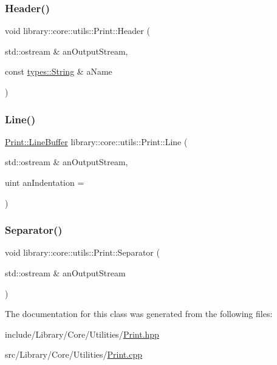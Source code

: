 \subsubsection{\texorpdfstring{Header()}{Header()}}
{\footnotesize\ttfamily void library\+::core\+::utils\+::\+Print\+::\+Header (\begin{DoxyParamCaption}\item[{std\+::ostream \&}]{an\+Output\+Stream,  }\item[{const \hyperlink{classlibrary_1_1core_1_1types_1_1String}{types\+::\+String} \&}]{a\+Name }\end{DoxyParamCaption})\hspace{0.3cm}{\ttfamily [static]}}

\mbox{\label{classlibrary_1_1core_1_1utils_1_1Print_ab4d98c65fbb58213358df534dd1f6d65}} 
\subsubsection{\texorpdfstring{Line()}{Line()}}
{\footnotesize\ttfamily \hyperlink{classlibrary_1_1core_1_1utils_1_1Print_1_1LineBuffer}{Print\+::\+Line\+Buffer} library\+::core\+::utils\+::\+Print\+::\+Line (\begin{DoxyParamCaption}\item[{std\+::ostream \&}]{an\+Output\+Stream,  }\item[{uint}]{an\+Indentation = {} }\end{DoxyParamCaption})\hspace{0.3cm}{\ttfamily [static]}}

\mbox{\label{classlibrary_1_1core_1_1utils_1_1Print_a58361390194e28388d3ac0ec0910cc0c}} 
\subsubsection{\texorpdfstring{Separator()}{Separator()}}
{\footnotesize\ttfamily void library\+::core\+::utils\+::\+Print\+::\+Separator (\begin{DoxyParamCaption}\item[{std\+::ostream \&}]{an\+Output\+Stream }\end{DoxyParamCaption})\hspace{0.3cm}{\ttfamily [static]}}



The documentation for this class was generated from the following files\+:\begin{DoxyCompactItemize}
\item 
include/\+Library/\+Core/\+Utilities/\hyperlink{Print_8hpp}{Print.\+hpp}\item 
src/\+Library/\+Core/\+Utilities/\hyperlink{Print_8cpp}{Print.\+cpp}\end{DoxyCompactItemize}
